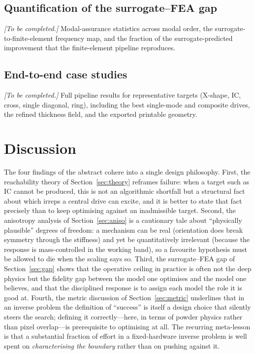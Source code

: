 \documentclass[11pt,a4paper]{article}
\begin{document}
\subsection{Quantification of the surrogate--FEA gap}
\noindent\textit{[To be completed.]} Modal-assurance statistics across modal
order, the surrogate-to-finite-element frequency map, and the fraction of the
surrogate-predicted improvement that the finite-element pipeline reproduces.

\subsection{End-to-end case studies}
\noindent\textit{[To be completed.]} Full pipeline results for representative
targets (X-shape, IC, cross, single diagonal, ring), including the best
single-mode and composite drives, the refined thickness field, and the exported
printable geometry.

\section{Discussion}\label{sec:discussion}

The four findings of the abstract cohere into a single design philosophy. First,
the reachability theory of Section~\ref{sec:theory} reframes failure: when a
target such as IC cannot be produced, this is not an algorithmic shortfall but a
structural fact about which irreps a central drive can excite, and it is better to
state that fact precisely than to keep optimising against an inadmissible target.
Second, the anisotropy analysis of Section~\ref{sec:aniso} is a cautionary tale
about ``physically plausible'' degrees of freedom: a mechanism can be real
(orientation does break symmetry through the stiffness) and yet be quantitatively
irrelevant (because the response is mass-controlled in the working band), so a
favourite hypothesis must be allowed to die when the scaling says so. Third, the
surrogate--FEA gap of Section~\ref{sec:gap} shows that the operative ceiling in
practice is often not the deep physics but the fidelity gap between the model one
optimises and the model one believes, and that the disciplined response is to
assign each model the role it is good at. Fourth, the metric discussion of
Section~\ref{sec:metric} underlines that in an inverse problem the definition of
``success'' is itself a design choice that silently steers the search; defining it
correctly---here, in terms of powder physics rather than pixel overlap---is
prerequisite to optimising at all. The recurring meta-lesson is that a substantial
fraction of effort in a fixed-hardware inverse problem is well spent on
\emph{characterising the boundary} rather than on pushing against it.
\end{document}
